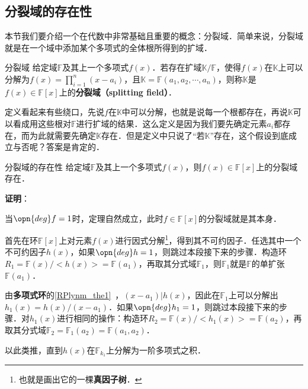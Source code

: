 


\subsection{分裂域的存在性}

本节我们要介绍一个在代数中非常基础且重要的概念：分裂域．简单来说，分裂域就是在一个域中添加某个多项式的全体根所得到的扩域．

\begin{definition}{分裂域}
给定域$\mathbb{F}$及其上一个多项式$f(x)$．若存在扩域$\mathbb{K}/\mathbb{F}$，使得$f(x)$在$\mathbb{K}$上可以分解为$f(x)=\prod_{i=1}^n (x-a_i)$，且$\mathbb{K}=\mathbb{F}(a_1, a_2, \cdots, a_n)$，则称$\mathbb{K}$是$f(x)\in \mathbb{F}[x]$上的\textbf{分裂域（splitting field）}．
\end{definition}

定义看起来有些绕口，先说$f$在$\mathbb{K}$中可以分解，也就是说每一个根都存在，再说$\mathbb{K}$可以看成用这些根对$\mathbb{F}$进行扩域的结果．这么定义是因为我们要先确定元素$a_i$都存在，而为此就需要先确定$\mathbb{K}$存在．但是定义中只说了“若$\mathbb{K}$”存在，这个假设到底成立与否呢？答案是肯定的．

\begin{theorem}{分裂域的存在性}
给定域$\mathbb{F}$及其上一个多项式$f(x)$，则$f(x)\in \mathbb{F}[x]$上的分裂域存在．
\end{theorem}

\textbf{证明}：

当$\opn{deg}f=1$时，定理自然成立，此时$f\in\mathbb{F}[x]$的分裂域就是其本身．

首先在环$\mathbb{F}[x]$上对元素$f(x)$进行因式分解\footnote{也就是画出它的一棵\textbf{真因子树}．}，得到其不可约因子．任选其中一个不可约因子$h(x)$，如果$\opn{deg} h = 1$，则跳过本段接下来的步骤．构造环$R_1=\mathbb{F}(x)/<h(x)>=\mathbb{F}(a_1)$，再取其分式域$\mathbb{F}_1$，则$\mathbb{F}_1$就是$\mathbb{F}$的单扩张$\mathbb{F}(a_1)$．

由\textbf{多项式环}的\autoref{RPlynm_the1}~，$(x-a_1)|h(x)$，因此在$\mathbb{F}_1$上可以分解出$h_1(x)=h(x)/(x-a_1)$．如果$\opn{deg}h_1 = 1$，则跳过本段接下来的步骤．对$h_1(x)$进行相同的操作：构造环$R_2=\mathbb{F}(x)/<h_1(x)>=\mathbb{F}(a_2)$，再取其分式域$\mathbb{F}_2=\mathbb{F}_1(a_2)=\mathbb{F}(a_1, a_2)$．

以此类推，直到$h(x)$在$\mathbb{F}_{k_1}$上分解为一阶多项式之积．

